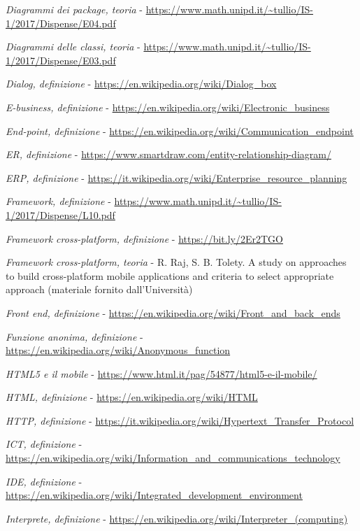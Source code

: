 \begin{enumerate}[label={[\arabic*]}]
	\item \textit{Diagrammi dei package, teoria} - \url{https://www.math.unipd.it/~tullio/IS-1/2017/Dispense/E04.pdf}
	\item \textit{Diagrammi delle classi, teoria} - \url{https://www.math.unipd.it/~tullio/IS-1/2017/Dispense/E03.pdf}
	\item \textit{Dialog, definizione} - \url{https://en.wikipedia.org/wiki/Dialog_box}
	\item \textit{E-business, definizione} - \url{https://en.wikipedia.org/wiki/Electronic_business}
	\item \textit{End-point, definizione} - \url{https://en.wikipedia.org/wiki/Communication_endpoint}
	\item \textit{ER, definizione} - \url{https://www.smartdraw.com/entity-relationship-diagram/}
	\item \textit{ERP, definizione} - \url{https://it.wikipedia.org/wiki/Enterprise_resource_planning}
	\item \textit{Framework, definizione} - \url{https://www.math.unipd.it/~tullio/IS-1/2017/Dispense/L10.pdf}
	\item \textit{Framework cross-platform, definizione} - \url{https://bit.ly/2Er2TGO}
	\item \textit{Framework cross-platform, teoria} - R. Raj, S. B. Tolety. A study on approaches to build cross-platform mobile applications and criteria to select appropriate approach (materiale fornito dall'Università)
	\item \textit{Front end, definizione} - \url{https://en.wikipedia.org/wiki/Front_and_back_ends}
	\item \textit{Funzione anonima, definizione} - \url{https://en.wikipedia.org/wiki/Anonymous_function}
	\item \textit{HTML5 e il mobile} - \url{https://www.html.it/pag/54877/html5-e-il-mobile/}
	\item \textit{HTML, definizione} - \url{https://en.wikipedia.org/wiki/HTML}
	\item \textit{HTTP, definizione} - \url{https://it.wikipedia.org/wiki/Hypertext_Transfer_Protocol}
	\item \textit{ICT, definizione} - \url{https://en.wikipedia.org/wiki/Information_and_communications_technology}
	\item \textit{IDE, definizione} - \url{https://en.wikipedia.org/wiki/Integrated_development_environment}
	\item \textit{Interprete, definizione} - \url{https://en.wikipedia.org/wiki/Interpreter_(computing)}

\end{enumerate}
